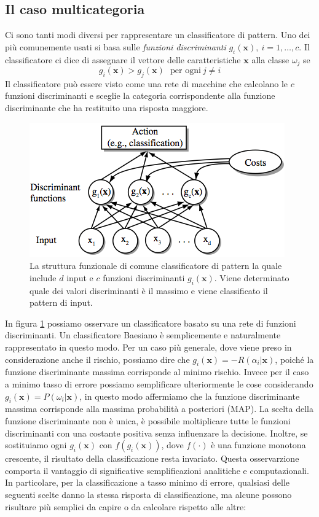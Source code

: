 \subsection{Il caso multicategoria}\label{casoMulticategoria}
Ci sono tanti modi diversi per rappresentare un classificatore di pattern. Uno dei più comunemente usati si basa sulle \emph{funzioni discriminanti} $g_i(\mathbf{x}), \ i = 1, \dots, c.$ Il classificatore ci dice di assegnare il vettore delle caratteristiche $\mathbf{x}$ alla classe $\omega_j$ se
\begin{equation}
g_i(\mathbf{x}) > g_j(\mathbf{x}) \ \ \ \text{per ogni} \ j \neq i
\end{equation}
Il classificatore può essere visto come una rete di macchine che calcolano le $c$ funzioni discriminanti e sceglie la categoria corrispondente alla funzione discriminante che ha restituito una risposta maggiore.
\begin{figure}
\centering
\includegraphics[scale=0.7]{img/network.png}
\caption{La struttura funzionale di comune classificatore di pattern la quale include $d$ input e $c$ funzioni discriminanti $g_i(\mathbf{x})$. Viene determinato quale dei valori discriminanti è il massimo e viene classificato il pattern di input.}
\label{network}
\end{figure}
In figura \ref{network} possiamo osservare un classificatore basato su una rete di funzioni discriminanti.
Un classificatore Baesiano  è semplicemente e naturalmente rappresentato in questo modo. Per un caso più generale, dove viene preso in considerazione anche il rischio, possiamo dire che $g_i(\mathbf{x}) = -R(\alpha_i|\mathbf{x})$, poiché la funzione discriminante massima corrisponde al minimo rischio. Invece per il caso a minimo tasso di errore possiamo semplificare ulteriormente le cose considerando $g_i(\mathbf{x}) = P(\omega_i|\mathbf{x})$, in questo modo affermiamo che la funzione discriminante massima corrisponde alla massima probabilità a posteriori (MAP). La scelta della funzione discriminante non è unica, è possibile moltiplicare tutte le funzioni discriminanti con una costante positiva senza influenzare la decisione. Inoltre, se sostituiamo ogni $g_i(\mathbf{x})$ con $f(g_i(\mathbf{x}))$, dove $f(\cdot)$ è una funzione monotona crescente, il risultato della classificazione resta invariato. Questa osservarzione comporta il vantaggio di significative semplificazioni analitiche e computazionali. In particolare, per la classificazione a tasso minimo di errore, qualsiasi delle seguenti scelte danno la stessa risposta di classificazione, ma alcune possono risultare più semplici da capire o da calcolare rispetto alle altre:
